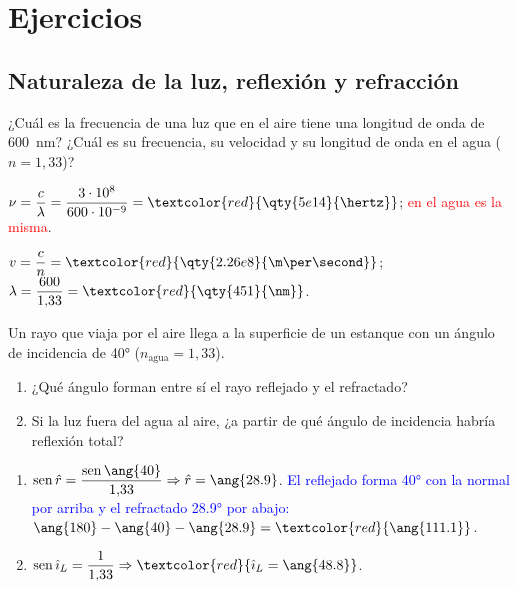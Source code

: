 
\section{Ejercicios}\label{sec:opt-ejercicios}

\subsection{Naturaleza de la luz, reflexión y refracción}

\begin{exercise}
    ¿Cuál es la frecuencia de una luz que en el aire tiene una longitud de onda de \qty{600}{\nm}? ¿Cuál es su frecuencia, su
    velocidad y su longitud de onda en el agua (\(n = 1{,}33\))?
    \begin{solu}
        \(\nu = \dfrac{c}{\lambda} = \dfrac{3\cdot 10^8}{600\cdot 10^{-9}} = \textcolor{red}{\qty{5e14}{\hertz}}\); \textcolor{red}{en el agua es la misma}.

        \(v = \dfrac{c}{n} = \textcolor{red}{\qty{2.26e8}{\m\per\second}}\); \(\lambda = \dfrac{600}{1{,}33} = \textcolor{red}{\qty{451}{\nm}}\).
    \end{solu}
\end{exercise}

\begin{exercise}
    Un rayo que viaja por el aire llega a la superficie de un estanque con un ángulo de incidencia de \ang{40}
    (\(n_{\text{agua}} = 1{,}33\)).
    \begin{enumerate}[label=\letraminuscula]
        \item ¿Qué ángulo forman entre sí el rayo reflejado y el refractado?
        \item Si la luz fuera del agua al aire, ¿a partir de qué ángulo de incidencia habría reflexión total?
    \end{enumerate}
    \begin{solu}
        \begin{enumerate}[label=\letraminuscula]
            \item \(\sen\hat r = \dfrac{\sen\ang{40}}{1{,}33} \Rightarrow \hat r = \ang{28.9}\).
            \textcolor{blue}{El reflejado forma \ang{40} con la normal por arriba y el refractado \ang{28.9} por abajo:}
            \(\ang{180} - \ang{40} - \ang{28.9} = \textcolor{red}{\ang{111.1}}\).
            \item \(\sen\hat{\imath}_L = \dfrac{1}{1{,}33} \Rightarrow \textcolor{red}{\hat{\imath}_L = \ang{48.8}}\).
        \end{enumerate}
    \end{solu}
\end{exercise}

